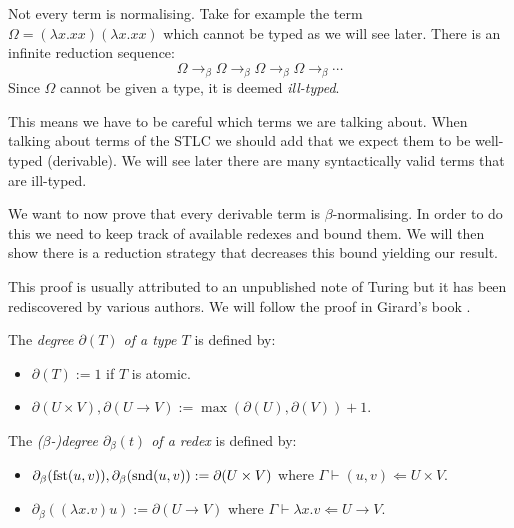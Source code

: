 \begin{remark}\label{beta_non_normalising_remark}
    Not every term is normalising. Take for example the term $\Omega=(\lambda x . x x)(\lambda x . x x)$ which cannot be typed as we will see later. There is an infinite reduction sequence:
    $$
        \Omega \to_{\beta} \Omega \to_{\beta} \Omega \to_{\beta} \Omega \to_{\beta} \cdots
    $$
    Since $\Omega$ cannot be given a type, it is deemed \emph{ill-typed}.
\end{remark}

This means we have to be careful which terms we are talking about. When talking about terms of the STLC we should add that we expect them to be well-typed (derivable). We will see later there are many syntactically valid terms that are ill-typed.

We want to now prove that every derivable term is $\beta$-normalising. In order to do this we need to keep track of available redexes and bound them. We will then show there is a reduction strategy that decreases this bound yielding our result.

This proof is usually attributed to an unpublished note of Turing but it has been rediscovered by various authors. We will follow the proof in Girard's book \cite{Girard1989}.

\begin{defin}
    The \emph{degree $\partial(T)$ of a type $T$} is defined by:
    \begin{itemize}
        \item $\partial(T) := 1$ if $T$ is atomic.
        \item $\partial(U \times V), \partial(U \to V) := \max(\partial(U), \partial(V))+1$.
    \end{itemize}
\end{defin}

\begin{defin}
    The \emph{($\beta$-)degree $\partial_{\beta}(t)$ of a redex} is defined by:
    \begin{itemize}
        \item $\partial_{\beta}(\mathrm{fst}(u,v)), \partial_{\beta}(\mathrm{snd}(u,v)) := \partial(U\times V)$ where $\Gamma \vdash (u, v) \Leftarrow U \times V$.
        \item $\partial_{\beta}((\lambda x . v) u) := \partial(U \to V)$ where $\Gamma \vdash \lambda x . v \Leftarrow U \to V$.
    \end{itemize}
\end{defin}

